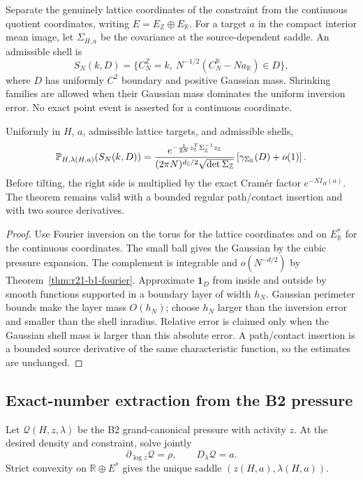 Separate the genuinely lattice coordinates of the constraint from the
continuous quotient coordinates, writing $E=E_{\mathbb Z}\oplus E_{\mathbb R}$.
For a target $a$ in the compact interior mean image, let
$\Sigma_{H,a}$ be the covariance at the source-dependent saddle.  An
admissible shell is
\[
 S_N(k,D)=\{C_N^{\mathbb Z}=k,
 \ N^{-1/2}(C_N^{\mathbb R}-Na_{\mathbb R})\in D\},
\]
where $D$ has uniformly $C^2$ boundary and positive Gaussian mass.  Shrinking
families are allowed when their Gaussian mass dominates the uniform inversion
error.  No exact point event is asserted for a continuous coordinate.

\begin{theorem}
\label{thm:r21-b1-coefficient}
Uniformly in $H$, $a$, admissible lattice targets, and admissible shells,
\[
 \mathbb P_{H,\lambda(H,a)}(S_N(k,D))
 ={e^{-\frac1{2N}z_{\mathbb Z}^T
       \Sigma_{\mathbb Z}^{-1}z_{\mathbb Z}}
   \over(2\pi N)^{d_{\mathbb Z}/2}
       \sqrt{\det\Sigma_{\mathbb Z}}}
 \left[\gamma_{\Sigma_{\mathbb R}}(D)+o(1)\right].
\]
Before tilting, the right side is multiplied by the exact Cram\'er factor
$e^{-NI_H(a)}$.  The theorem remains valid with a bounded regular
path/contact insertion and with two source derivatives.
\end{theorem}

\begin{proof}
Use Fourier inversion on the torus for the lattice coordinates and on
$E_{\mathbb R}^*$ for the continuous coordinates.  The small ball gives the
Gaussian by the cubic pressure expansion.  The complement is integrable and
$o(N^{-d/2})$ by Theorem~\ref{thm:r21-b1-fourier}.  Approximate
$\mathbf1_D$ from inside and outside by smooth functions supported in a
boundary layer of width $h_N$.  Gaussian perimeter bounds make the layer mass
$O(h_N)$; choose $h_N$ larger than the inversion error and smaller than the
shell inradius.  Relative error is claimed only when the Gaussian shell mass
is larger than this absolute error.  A path/contact insertion is a bounded
source derivative of the same characteristic function, so the estimates are
unchanged.
\end{proof}

\subsection{Exact-number extraction from the B2 pressure}

Let $\mathcal Q(H,z,\lambda)$ be the B2 grand-canonical pressure with activity
$z$.  At the desired density and constraint, solve jointly
\[
 \partial_{\log z}\mathcal Q=\rho,
 \qquad D_\lambda\mathcal Q=a.
\]
Strict convexity on $\mathbb R\oplus E^*$ gives the unique saddle
$(z(H,a),\lambda(H,a))$.


